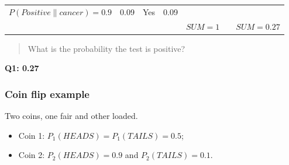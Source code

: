 \documentclass[]{book}
\providecommand{\tightlist}{%
  \setlength{\itemsep}{0pt}\setlength{\parskip}{0pt}}
\begin{document}
\begin{longtable}[]{@{}ccccccc@{}}
\begin{minipage}[t]{0.04\columnwidth}
\(P(Positive\| cancer) = 0.9\)\strut
\end{minipage} & \begin{minipage}[t]{0.04\columnwidth}\centering\strut
0.09\strut
\end{minipage} & \begin{minipage}[t]{0.04\columnwidth}\centering\strut
Yes\strut
\end{minipage} & \begin{minipage}[t]{0.04\columnwidth}\centering\strut
0.09\strut
\end{minipage}\tabularnewline
\begin{minipage}[t]{0.04\columnwidth}\centering\strut
\strut
\end{minipage} & \begin{minipage}[t]{0.04\columnwidth}\centering\strut
\strut
\end{minipage} & \begin{minipage}[t]{0.04\columnwidth}\centering\strut
\strut
\end{minipage} & \begin{minipage}[t]{0.04\columnwidth}\centering\strut
\strut
\end{minipage} & \begin{minipage}[t]{0.04\columnwidth}\centering\strut
\(SUM = 1\)\strut
\end{minipage} & \begin{minipage}[t]{0.04\columnwidth}\centering\strut
\strut
\end{minipage} & \begin{minipage}[t]{0.04\columnwidth}\centering\strut
\(SUM = 0.27\)\strut
\end{minipage}\tabularnewline
\bottomrule
\end{longtable}

\begin{quote}
What is the probability the test is positive?
\end{quote}

\textbf{Q1: 0.27}

\subsubsection*{Coin flip example}\label{coin-flip-example}

Two coins, one fair and other loaded.

\begin{itemize}
\tightlist
\item
  Coin 1: \(P_1(HEADS) = P_1(TAILS) = 0.5\);
\item
  Coin 2: \(P_2(HEADS) = 0.9\) and \(P_2(TAILS) = 0.1\).
\end{itemize}
\end{document}

